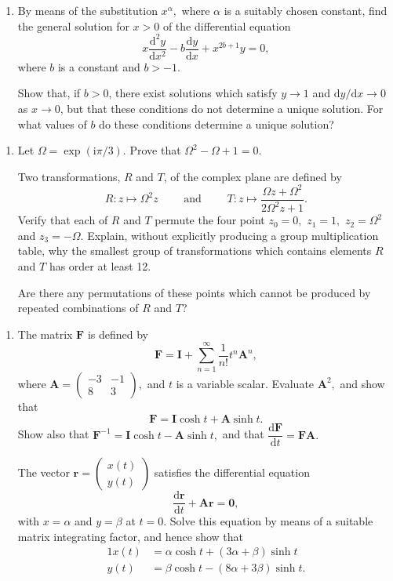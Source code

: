 \documentclass[a4, 11pt]{report}
\newlength{\qspace}
\newcounter{qnumber}
\newenvironment{question}%
 {\vspace{\qspace}
  \begin{enumerate}[\bfseries 1\quad][10]%
    \setcounter{enumi}{\value{qnumber}}%
    \item%
 }
{
  \end{enumerate}
  \filbreak
  \stepcounter{qnumber}
 }
\begin{document}
\begin{question}
	By means of the substitution $x^{\alpha},$ where $\alpha$ is a suitably
	chosen constant, find the general solution for $x>0$ of the differential
	equation 
	\[
	x\frac{\mathrm{d}^{2}y}{\mathrm{d}x^{2}}-b\frac{\mathrm{d}y}{\mathrm{d}x}+x^{2b+1}y=0,
	\]
	where $b$ is a constant and $b>-1$. 


	Show that, if $b>0$, there exist solutions which satisfy $y\rightarrow1$
	and $\mathrm{d}y/\mathrm{d}x\rightarrow0$ as $x\rightarrow0$, but
	that these conditions do not determine a unique solution. For what
	values of $b$ do these conditions determine a unique solution?
	
	
	\end{question}
	
	\begin{question}
		Let $\Omega=\exp(\mathrm{i}\pi/3).$ Prove that $\Omega^{2}-\Omega+1=0.$


		Two transformations, $R$ and $T$, of the complex plane are defined
		by 
		\[
		R:z\longmapsto\Omega^{2}z\qquad\mbox{ and }\qquad T:z\longmapsto\dfrac{\Omega z+\Omega^{2}}{2\Omega^{2}z+1}.
		\]
		 Verify that each of $R$ and $T$ permute the four point $z_{0}=0,$
		$z_{1}=1,$ $z_{2}=\Omega^{2}$ and $z_{3}=-\Omega.$ Explain, without
		explicitly producing a group multiplication table, why the smallest
		group of transformations which contains elements $R$ and $T$ has
		order at least 12. 


		Are there any permutations of these points which cannot be produced
		by repeated combinations of $R$ and $T$?
		\end{question}
		
		
		\begin{question}
The matrix $\mathbf{F}$ is defined by 
\[
\mathbf{F}=\mathbf{I}+\sum_{n=1}^{\infty}\frac{1}{n!}t^{n}\mathbf{A}^{n},
\]
where $\mathbf{A}=\begin{pmatrix}-3 & -1\\
8 & 3
\end{pmatrix},$ and $t$ is a variable scalar. Evaluate $\mathbf{A}^{2},$ and show
that 
\[
\mathbf{F}=\mathbf{I}\cosh t+\mathbf{A}\sinh t.
\]
Show also that $\mathbf{F}^{-1}=\mathbf{I}\cosh t-\mathbf{A}\sinh t,$
and that $\dfrac{\mathrm{d}\mathbf{F}}{\mathrm{d}t}=\mathbf{FA}.$


The vector $\mathbf{r}=\begin{pmatrix}x(t)\\
y(t)
\end{pmatrix}$ satisfies the differential equation 
\[
\frac{\mathrm{d}\mathbf{r}}{\mathrm{d}t}+\mathbf{A}\mathbf{r}=\mathbf{0},
\]
with $x=\alpha$ and $y=\beta$ at $t=0.$ Solve this equation by
means of a suitable matrix integrating factor, and hence show that
\begin{alignat*}{1}
x(t) & =\alpha\cosh t+(3\alpha+\beta)\sinh t\\
y(t) & =\beta\cosh t-(8\alpha+3\beta)\sinh t.
\end{alignat*}
		\end{question}
		
\end{document}
